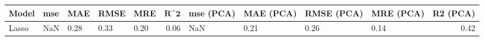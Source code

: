 \begin{table}
\centering
\label{table:iri_reg_pred}
\begin{tabular}{lllllrllllr}
\toprule
\textbf{Model} & \textbf{mse} & \textbf{MAE} & \textbf{RMSE} & \textbf{MRE} & $\textbf{R^2}$ & \textbf{mse (PCA)} & \textbf{MAE (PCA)} & \textbf{RMSE (PCA)} & \textbf{MRE (PCA)} & \textbf{R2 (PCA)} \\
\midrule
         Lasso &          NaN &         0.28 &          0.33 &         0.20 &           0.06 &                NaN &               0.21 &                0.26 &               0.14 &              0.42 \\
\bottomrule
\end{tabular}
\end{table}
